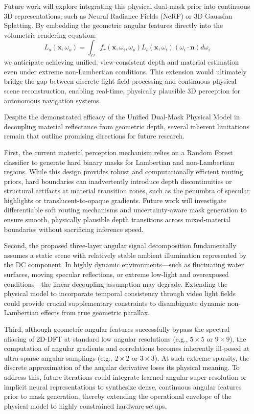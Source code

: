 Future work will explore integrating this physical dual-mask prior into continuous 3D representations, such as Neural Radiance Fields (NeRF) or 3D Gaussian Splatting. By embedding the geometric angular features directly into the volumetric rendering equation:
\begin{equation}
\label{eq:eq4}
L_o(\mathbf{x}, \omega_o) = \int_{\Omega} f_r(\mathbf{x}, \omega_i, \omega_o) L_i(\mathbf{x}, \omega_i) (\omega_i \cdot \mathbf{n}) d\omega_i
\end{equation}
we anticipate achieving unified, view-consistent depth and material estimation even under extreme non-Lambertian conditions. This extension would ultimately bridge the gap between discrete light field processing and continuous physical scene reconstruction, enabling real-time, physically plausible 3D perception for autonomous navigation systems.

Despite the demonstrated efficacy of the Unified Dual-Mask Physical Model in decoupling material reflectance from geometric depth, several inherent limitations remain that outline promising directions for future research. 

First, the current material perception mechanism relies on a Random Forest classifier to generate hard binary masks for Lambertian and non-Lambertian regions. While this design provides robust and computationally efficient routing priors, hard boundaries can inadvertently introduce depth discontinuities or structural artifacts at material transition zones, such as the penumbra of specular highlights or translucent-to-opaque gradients. Future work will investigate differentiable soft routing mechanisms and uncertainty-aware mask generation to ensure smooth, physically plausible depth transitions across mixed-material boundaries without sacrificing inference speed.

Second, the proposed three-layer angular signal decomposition fundamentally assumes a static scene with relatively stable ambient illumination represented by the DC component. In highly dynamic environments—such as fluctuating water surfaces, moving specular reflections, or extreme low-light and overexposed conditions—the linear decoupling assumption may degrade. Extending the physical model to incorporate temporal consistency through video light fields could provide crucial supplementary constraints to disambiguate dynamic non-Lambertian effects from true geometric parallax.

Third, although geometric angular features successfully bypass the spectral aliasing of 2D-DFT at standard low angular resolutions (e.g., $5 \times 5$ or $9 \times 9$), the computation of angular gradients and correlations becomes inherently ill-posed at ultra-sparse angular samplings (e.g., $2 \times 2$ or $3 \times 3$). At such extreme sparsity, the discrete approximation of the angular derivative loses its physical meaning. To address this, future iterations could integrate learned angular super-resolution or implicit neural representations to synthesize dense, continuous angular features prior to mask generation, thereby extending the operational envelope of the physical model to highly constrained hardware setups.

